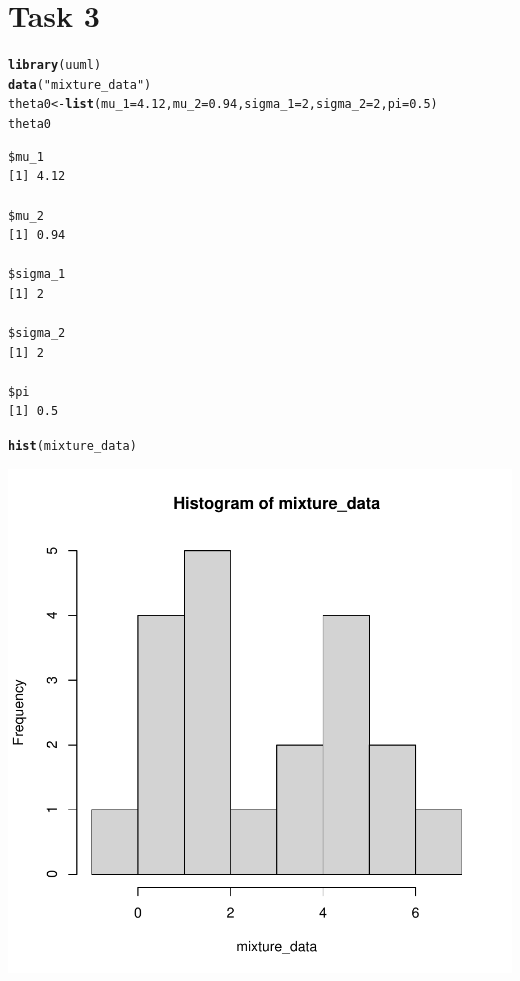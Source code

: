 \documentclass[10pt, a4paper, english]{article}\usepackage[]{graphicx}\usepackage[dvipsnames]{xcolor}
\makeatletter
\def\maxwidth{ %
  \ifdim\Gin@nat@width>\linewidth
    \linewidth
  \else
    \Gin@nat@width
  \fi
}
\newcommand{\hlnum}[1]{\textcolor[rgb]{0.686,0.059,0.569}{#1}}%
\newcommand{\hlstr}[1]{\textcolor[rgb]{0.192,0.494,0.8}{#1}}%
\newcommand{\hlstd}[1]{\textcolor[rgb]{0.345,0.345,0.345}{#1}}%
\newcommand{\hlkwb}[1]{\textcolor[rgb]{0.69,0.353,0.396}{#1}}%
\newcommand{\hlkwc}[1]{\textcolor[rgb]{0.333,0.667,0.333}{#1}}%
\newcommand{\hlkwd}[1]{\textcolor[rgb]{0.737,0.353,0.396}{\textbf{#1}}}%
\newenvironment{kframe}{%
 \def\at@end@of@kframe{}%
 \ifinner\ifhmode%
  \def\at@end@of@kframe{\end{minipage}}%
  \begin{minipage}{\columnwidth}%
 \fi\fi%
 \def\FrameCommand##1{\hskip\@totalleftmargin \hskip-\fboxsep
 \colorbox{shadecolor}{##1}\hskip-\fboxsep
     \hskip-\linewidth \hskip-\@totalleftmargin \hskip\columnwidth}%
 \MakeFramed {\advance\hsize-\width
   \@totalleftmargin\z@ \linewidth\hsize
   \@setminipage}}%
 {\par\unskip\endMakeFramed%
 \at@end@of@kframe}
\newenvironment{knitrout}{}{} %
\makeatother
\begin{document}
\section{Task 3}
\begin{knitrout}
\color{fgcolor}\begin{kframe}
\begin{alltt}
\hlkwd{library}\hlstd{(uuml)}
\hlkwd{data}\hlstd{(}\hlstr{"mixture_data"}\hlstd{)}
\hlstd{theta0} \hlkwb{<-} \hlkwd{list}\hlstd{(}\hlkwc{mu_1} \hlstd{=} \hlnum{4.12}\hlstd{,} \hlkwc{mu_2} \hlstd{=} \hlnum{0.94}\hlstd{,} \hlkwc{sigma_1} \hlstd{=} \hlnum{2}\hlstd{,} \hlkwc{sigma_2} \hlstd{=} \hlnum{2}\hlstd{,} \hlkwc{pi} \hlstd{=} \hlnum{0.5}\hlstd{)}
\hlstd{theta0}
\end{alltt}
\begin{verbatim}
$mu_1
[1] 4.12

$mu_2
[1] 0.94

$sigma_1
[1] 2

$sigma_2
[1] 2

$pi
[1] 0.5
\end{verbatim}
\begin{alltt}
\hlkwd{hist}\hlstd{(mixture_data)}
\end{alltt}
\end{kframe}
\includegraphics[width=\maxwidth]{figure/unnamed-chunk-22-1} 
\end{knitrout}
\end{document}
